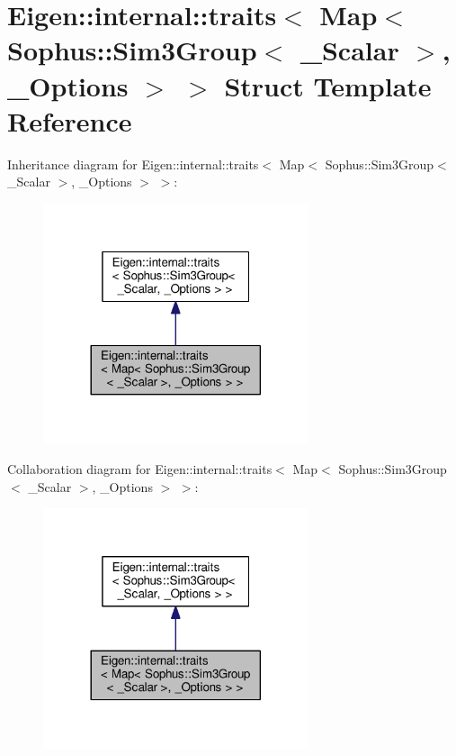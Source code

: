 \hypertarget{struct_eigen_1_1internal_1_1traits_3_01_map_3_01_sophus_1_1_sim3_group_3_01___scalar_01_4_00_01___options_01_4_01_4}{}\section{Eigen\+:\+:internal\+:\+:traits$<$ Map$<$ Sophus\+:\+:Sim3\+Group$<$ \+\_\+\+Scalar $>$, \+\_\+\+Options $>$ $>$ Struct Template Reference}
\label{struct_eigen_1_1internal_1_1traits_3_01_map_3_01_sophus_1_1_sim3_group_3_01___scalar_01_4_00_01___options_01_4_01_4}


Inheritance diagram for Eigen\+:\+:internal\+:\+:traits$<$ Map$<$ Sophus\+:\+:Sim3\+Group$<$ \+\_\+\+Scalar $>$, \+\_\+\+Options $>$ $>$\+:
\nopagebreak
\begin{figure}[H]
\begin{center}
\leavevmode
\includegraphics[width=221pt]{struct_eigen_1_1internal_1_1traits_3_01_map_3_01_sophus_1_1_sim3_group_3_01___scalar_01_4_00_01_1de7e4eff97b0c568bd49784f0f8ff30}
\end{center}
\end{figure}


Collaboration diagram for Eigen\+:\+:internal\+:\+:traits$<$ Map$<$ Sophus\+:\+:Sim3\+Group$<$ \+\_\+\+Scalar $>$, \+\_\+\+Options $>$ $>$\+:
\nopagebreak
\begin{figure}[H]
\begin{center}
\leavevmode
\includegraphics[width=221pt]{struct_eigen_1_1internal_1_1traits_3_01_map_3_01_sophus_1_1_sim3_group_3_01___scalar_01_4_00_01_48dec31b44a7e1dd9f2cb942569b6e43}
\end{center}
\end{figure}
